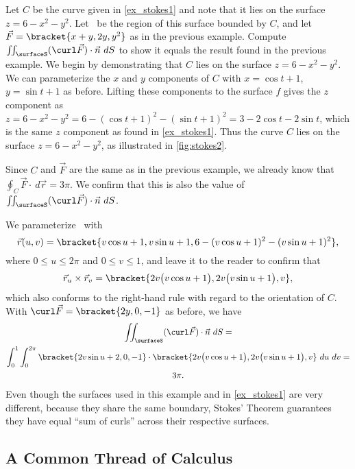 \begin{example}\label{ex_stokes2}
Let $C$ be the curve given in \autoref{ex_stokes1} and note that it lies on the surface $z = 6-x^2-y^2$. Let \surfaceS\ be the region of this surface bounded by $C$, and let $\vec F =\bracket{x+y,2y,y^2}$ as in the previous example. Compute $\iint_\surfaceS (\curl\vec F)\cdot \vec n\ dS $ to show it equals the result found in the previous example.
\solution
We begin by demonstrating that $C$ lies on the surface $z=6-x^2-y^2$. We can parameterize the $x$ and $y$ components of $C$ with $x=\cos t+1$, $y=\sin t+1$ as before. Lifting these components to the surface $f$ gives the $z$ component as $z = 6-x^2-y^2 = 6-(\cos t+1)^2-(\sin t+1)^2 = 3-2\cos t-2\sin t$, which is the same $z$ component as found in \autoref{ex_stokes1}. Thus the curve $C$ lies on the surface $z=6-x^2-y^2$, as illustrated in \autoref{fig:stokes2}. 

Since $C$ and $\vec F$ are the same as in the previous example, we already know that $\oint_C\vec F\cdot\ d\vec r = 3\pi$. We confirm that this is also the value of $\iint_\surfaceS (\curl\vec F)\cdot \vec n\ dS $.

We parameterize \surfaceS\ with
\[\vec r(u,v) =\bracket{v\cos u+1,v\sin u+1, 6-(v\cos u+1)^2-(v\sin u+1)^2},\]
where $0\leq u\leq 2\pi$ and $0\leq v\leq 1$, and leave it to the reader to confirm that
\[
\vec r_u\times \vec r_v =\bracket{2v\bigl(v\cos u+1\bigr), 2v\bigl(v\sin u+1\bigr),v},
\]
which also conforms to the right-hand rule with regard to the orientation of $C$. With $\curl \vec F =\bracket{2y,0,-1}$ as before, we have
\begin{multline*}
	\iint_\surfaceS (\curl\vec F)\cdot \vec n\ dS = \\ 
	\int_0^1\int_0^{2\pi}\bracket{2v\sin u+2,0,-1}\cdot\bracket{2v\bigl(v\cos u+1\bigr), 2v\bigl(v\sin u+1\bigr),v}\ du\ dv =\\
	3\pi.
\end{multline*}
Even though the  surfaces used in this example and in \autoref{ex_stokes1} are very different, because they share the same boundary, Stokes' Theorem guarantees they have equal ``sum of curls'' across their respective surfaces.
\end{example}

\subsection{A Common Thread of Calculus}

